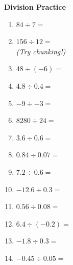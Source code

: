 \documentclass[12pt,a4paper]{article}
\begin{document}
\begin{center}
\textbf{Division Practice}
\end{center}

\begin{center}
\begin{minipage}[t]{0.3\textwidth}
\vspace{0.5em}
\begin{enumerate}
    \item $84 \div 7 =$ \vspace{1em}
    \item $156 \div 12 =$ \\[0.3em]
    \textit{(Try chunking!)} \vspace{1em}
    \item $48 \div (-6) =$ \vspace{1em}
    \item $4.8 \div 0.4 =$ \vspace{1em}
\end{enumerate}
\end{minipage}
\hfill
\begin{minipage}[t]{0.3\textwidth}  
\begin{enumerate}\setcounter{enumi}{4}
    \item $-9 \div -3 =$ \vspace{1em}
    \item $8280 \div 24 =$ \vspace{1em}
    \item $3.6 \div 0.6 =$ \vspace{1em}
    \item $0.84 \div 0.07 =$ \vspace{1em}
    \item $7.2 \div 0.6 =$
\end{enumerate}
\end{minipage}
\hfill
\begin{minipage}[t]{0.3\textwidth}
\begin{enumerate}\setcounter{enumi}{9}
    \item $-12.6 \div 0.3 =$ \vspace{1em}
    \item $0.56 \div 0.08 =$ \vspace{1em}
    \item $6.4 \div (-0.2) =$ \vspace{1em}
    \item $-1.8 \div 0.3 =$ \vspace{1em}
    \item $-0.45 \div 0.05 =$
\end{enumerate}
\end{minipage}
\end{center}
\end{document}
